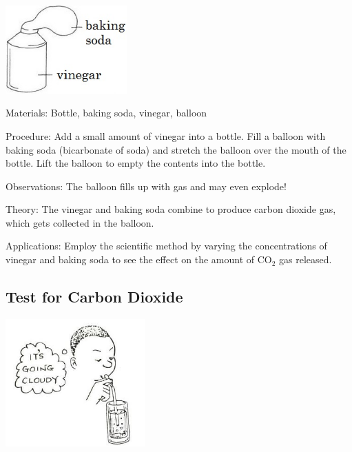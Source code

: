 \begin{multicols}{2}
\begin{center}
\includegraphics[width=0.35\textwidth]{./img/vso/co2-balloon.jpg}
\end{center}

\begin{description*}
\item[Materials:]{Bottle, baking soda, vinegar, balloon}
\item[Procedure:]{Add a small amount of vinegar into a bottle. Fill a balloon with baking soda (bicarbonate of soda) and stretch the balloon over the mouth of the bottle. Lift the balloon to empty the contents into the bottle.}
\item[Observations:]{The balloon fills up with gas and may even explode!}
\item[Theory:]{The vinegar and baking soda combine to produce carbon dioxide gas, which gets collected in the balloon.}
\item[Applications:]{Employ the scientific method by varying the concentrations of vinegar and baking soda to see the effect on the amount of CO$_2$ gas released.}
\end{description*}

\subsection{Test for Carbon Dioxide}

\begin{center}
\includegraphics[width=0.4\textwidth]{./img/source/limewater-cloudy.jpg}
\end{center}


\end{multicols}
